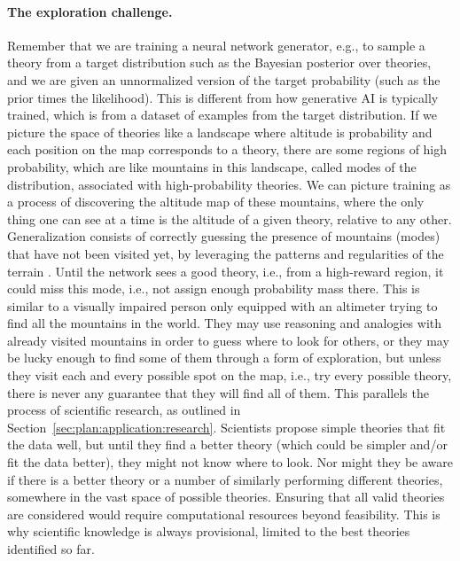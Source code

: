 \paragraph{The exploration challenge.} Remember that we are training a neural network generator, e.g., to sample a theory from a target distribution such as the Bayesian posterior over theories, and we are given an unnormalized version of the target probability (such as the prior times the likelihood). This is different from how generative AI is typically trained, which is from a dataset of examples from the target distribution. If we picture the space of theories like a landscape where altitude is probability and each position on the map corresponds to a theory, there are some regions of high probability, which are like mountains in this landscape, called modes of the distribution, associated with high-probability theories. We can picture training as a process of discovering the altitude map of these mountains, where the only thing one can see at a time is the altitude of a given theory, relative to any other. Generalization consists of correctly guessing the presence of mountains (modes) that have not been visited yet, by leveraging the patterns and regularities of the terrain \cite{openreview.net.forum.id.umFrtGMWaQ,openreview.net.forum.id.BdmVgLMvaf}. Until the network sees a good theory, i.e., from a high-reward region, it could miss this mode, i.e., not assign enough probability mass there. This is similar to a visually impaired person only equipped with an altimeter trying to find all the mountains in the world. They may use reasoning and analogies with already visited mountains in order to guess where to look for others, or they may be lucky enough to find some of them through a form of exploration, but unless they visit each and every possible spot on the map, i.e., try every possible theory, there is never any guarantee that they will find all of them. This parallels the process of scientific research, as outlined in Section~\ref{sec:plan:application:research}. Scientists propose simple theories that fit the data well, but until they find a better theory (which could be simpler and/or fit the data better), they might not know where to look. Nor might they be aware if there is a better theory or a number of similarly performing different theories, somewhere in the vast space of possible theories. Ensuring that all valid theories are considered would require computational resources beyond feasibility. This is why scientific knowledge is always provisional, limited to the best theories identified so far.

